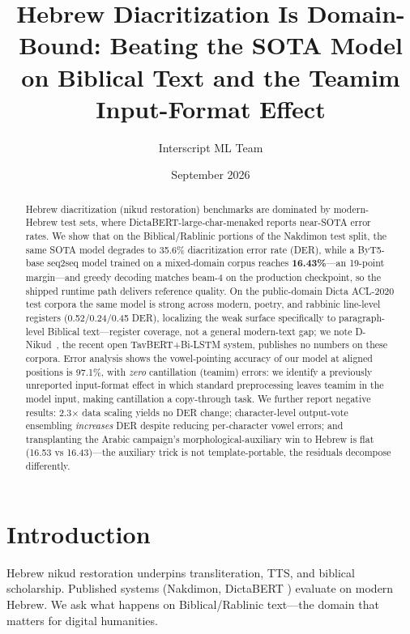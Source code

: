 \documentclass[11pt]{article}
\title{Hebrew Diacritization Is Domain-Bound: Beating the SOTA Model\\ on Biblical Text and the Teamim Input-Format Effect}
\author{Interscript ML Team}
\date{September 2026}
\begin{document}
\maketitle

\begin{abstract}
Hebrew diacritization (nikud restoration) benchmarks are dominated by
modern-Hebrew test sets, where DictaBERT-large-char-menaked reports
near-SOTA error rates. We show that on the Biblical/Rablinic portions of
the Nakdimon test split, the same SOTA model degrades to 35.6\% diacritization
error rate (DER), while a ByT5-base seq2seq model trained on a mixed-domain
corpus reaches \textbf{16.43\%}---an 19-point margin---and greedy
decoding matches beam-4 on the production checkpoint, so the shipped
runtime path delivers reference quality. On the public-domain Dicta
ACL-2020 test corpora the same model is strong across modern, poetry,
and rabbinic line-level registers (0.52/0.24/0.45 DER), localizing the
weak surface specifically to paragraph-level Biblical text---register
coverage, not a general modern-text gap; we note D-Nikud~\cite{dnikud}, the recent
open TavBERT+Bi-LSTM system, publishes no numbers on these corpora.
Error analysis shows the vowel-pointing accuracy of our model at
aligned positions is 97.1\%,
with \emph{zero} cantillation (teamim) errors: we identify a previously
unreported input-format effect in which standard preprocessing leaves
teamim in the model input, making cantillation a copy-through task. We
further report negative results: 2.3$\times$ data scaling yields no DER
change; character-level output-vote ensembling \emph{increases} DER
despite reducing per-character vowel errors; and transplanting the
Arabic campaign's morphological-auxiliary win to Hebrew is flat
(16.53 vs 16.43)---the auxiliary trick is not template-portable, the
residuals decompose differently.
\end{abstract}

\section{Introduction}
Hebrew nikud restoration underpins transliteration, TTS, and biblical
scholarship. Published systems (Nakdimon, DictaBERT
\cite{dictabert}) evaluate on modern Hebrew. We ask what happens on
Biblical/Rablinic text---the domain that matters for digital humanities.
\end{document}
